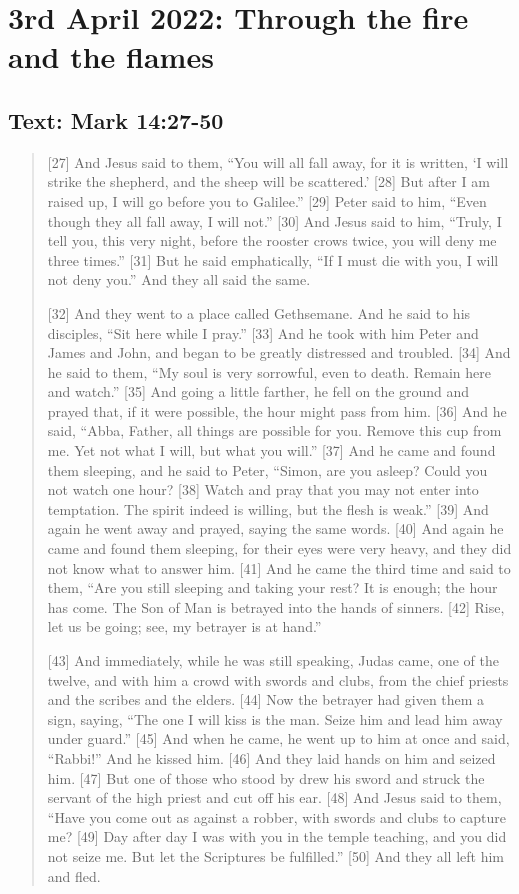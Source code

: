 \section{3rd April 2022: Through the fire and the flames}
\subsection*{Text: Mark 14:27-50}
  \begin{quote}
    [27] And Jesus said to them, “You will all fall away, for it is written,
    ‘I will strike the shepherd, and the sheep will be scattered.’ [28] But
    after I am raised up, I will go before you to Galilee.” [29] Peter said
    to him, “Even though they all fall away, I will not.” [30] And Jesus said
    to him, “Truly, I tell you, this very night, before the rooster crows
    twice, you will deny me three times.” [31] But he said emphatically, “If
    I must die with you, I will not deny you.” And they all said the same.

    [32] And they went to a place called Gethsemane.  And he said to his
    disciples, “Sit here while I pray.” [33] And he took with him Peter and
    James and John, and began to be greatly distressed and troubled.  [34]
    And he said to them, “My soul is very sorrowful, even to death.  Remain
    here and watch.” [35] And going a little farther, he fell on the ground
    and prayed that, if it were possible, the hour might pass from him.  [36]
    And he said, “Abba, Father, all things are possible for you.  Remove this
    cup from me.  Yet not what I will, but what you will.” [37] And he came
    and found them sleeping, and he said to Peter, “Simon, are you asleep?
    Could you not watch one hour?  [38] Watch and pray that you may not enter
    into temptation.  The spirit indeed is willing, but the flesh is weak.”
    [39] And again he went away and prayed, saying the same words.  [40] And
    again he came and found them sleeping, for their eyes were very heavy,
    and they did not know what to answer him.  [41] And he came the third
    time and said to them, “Are you still sleeping and taking your rest?  It
    is enough; the hour has come.  The Son of Man is betrayed into the hands
    of sinners.  [42] Rise, let us be going; see, my betrayer is at hand.”

    [43] And immediately, while he was still speaking, Judas came, one of the
    twelve, and with him a crowd with swords and clubs, from the chief
    priests and the scribes and the elders.  [44] Now the betrayer had given
    them a sign, saying, “The one I will kiss is the man.  Seize him and lead
    him away under guard.” [45] And when he came, he went up to him at once
    and said, “Rabbi!” And he kissed him.  [46] And they laid hands on him
    and seized him.  [47] But one of those who stood by drew his sword and
    struck the servant of the high priest and cut off his ear.  [48] And
    Jesus said to them, “Have you come out as against a robber, with swords
    and clubs to capture me?  [49] Day after day I was with you in the temple
    teaching, and you did not seize me.  But let the Scriptures be
    fulfilled.” [50] And they all left him and fled.
  \end{quote}
